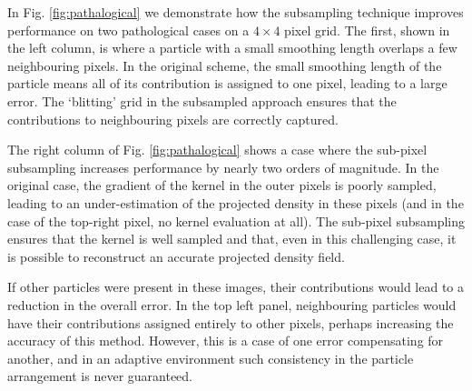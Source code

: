 In Fig. \ref{fig:pathalogical} we demonstrate how the subsampling technique improves performance on two pathological cases on a $4\times4$ pixel grid. The first, shown in the left column, is where a particle with a small smoothing length overlaps a few neighbouring pixels. In the original scheme, the small smoothing length of the particle means all of its contribution is assigned to one pixel, leading to a large error. The `blitting' grid in the subsampled approach ensures that the contributions to neighbouring pixels are correctly captured.

The right column of Fig. \ref{fig:pathalogical} shows a case where the sub-pixel subsampling increases performance by nearly two orders of magnitude. In the original case, the gradient of the kernel in the outer pixels is poorly sampled, leading to an under-estimation of the projected density in these pixels (and in the case of the top-right pixel, no kernel evaluation at all). The sub-pixel subsampling ensures that the kernel is well sampled and that, even in this challenging case, it is possible to reconstruct an accurate projected density field.

If other particles were present in these images, their contributions would lead to a reduction in the overall error. In the top left panel, neighbouring particles would have their contributions assigned entirely to other pixels, perhaps increasing the accuracy of this method. However, this is a case of one error compensating for another, and in an adaptive environment such consistency in the particle arrangement is never guaranteed.